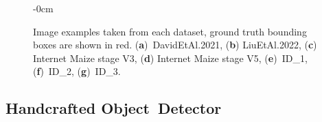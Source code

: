 \documentclass[12pt,a4paper,oneside]{report}
\newlength{\extralength}
\begin{document}
\begin{figure}[H]
\begin{adjustwidth}{-\extralength}{0cm}

\end{adjustwidth}
  \caption{Image examples taken from each dataset, ground truth bounding boxes are shown  in red. %
  (\textbf{a})~DavidEtAl.2021, 
 (\textbf{b}) LiuEtAl.2022, 
  (\textbf{c}) Internet Maize stage V3,
  (\textbf{d}) Internet Maize stage V5,
  (\textbf{e})~ID\_1,
  (\textbf{f})~ID\_2,
  (\textbf{g})~ID\_3.}
  \label{fig:datasets}  
\end{figure}
\vspace{-10pt}
\subsection{Handcrafted Object~Detector}
\end{document}
